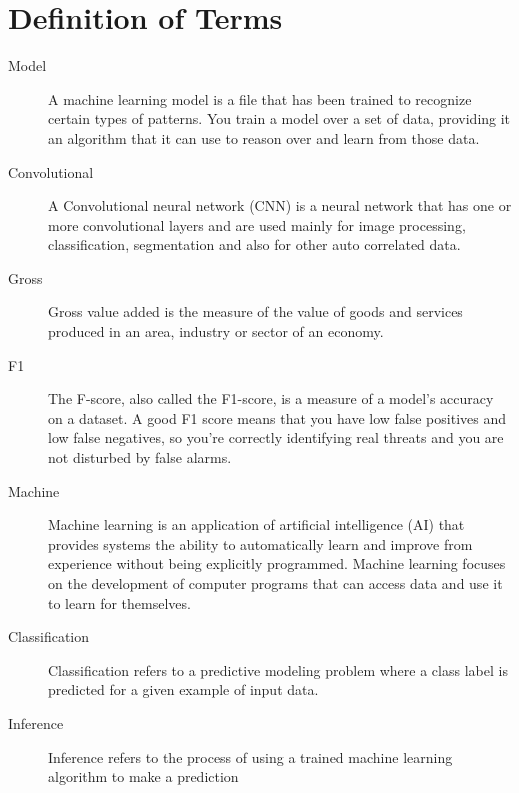\section{Definition of Terms}
    \begin{description}
        \item[Model]{
              A machine learning model is a file that has
              been trained to recognize certain types of patterns.
              You train a model over a set of data, providing it an
              algorithm that it can use to reason over and learn 
          from those data.}

      \item[Convolutional]{
              A Convolutional neural network (CNN) is a neural network 
              that has one or more convolutional layers and are used mainly
              for image processing, classification, segmentation and also 
          for other auto correlated data.}

      \item[Gross]{
              Gross value added is the measure of the value of 
              goods and services produced in an area, industry or sector 
          of an economy.}

      \item[F1]{
              The F-score, also called the F1-score, is a measure of a model's accuracy 
              on a dataset. A good F1 score means that you have low false positives and 
              low false negatives, so you're correctly identifying real threats and you 
              are not disturbed by false alarms.}
              
      \item[Machine]{
              Machine learning is an application of artificial intelligence 
              (AI) that provides systems the ability to automatically learn and
              improve from experience without being explicitly programmed. 
              Machine learning focuses on the development of computer programs 
              that can access data and use it to learn for themselves.}

     \item[Classification]{
              Classification refers to a predictive modeling problem where a
              class label is predicted for a given example of input data.}
              
    \item[Inference]{
              Inference refers to the process of using a trained machine learning algorithm to make a prediction}


\end{description}

